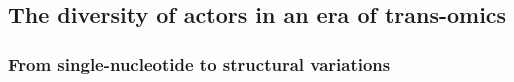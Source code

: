 \documentclass[letter]{bioinfo}
\newcommand{\comment}[1]{\textcolor{red}{#1}}
\begin{document}
	
	
	
\subsection*{The diversity of actors in an era of trans-omics}

\subsubsection*{From single-nucleotide to structural variations}
	
	
\end{document}
